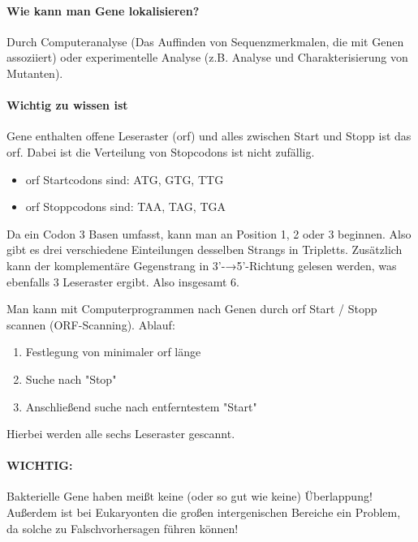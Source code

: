 \paragraph{Wie kann man Gene lokalisieren?} Durch Computeranalyse (Das Auffinden von Sequenzmerkmalen, die mit Genen assoziiert) oder experimentelle Analyse (z.B. Analyse und Charakterisierung von Mutanten).
\paragraph{Wichtig zu wissen ist} Gene enthalten offene Leseraster 
(\gls{orf}) und alles zwischen Start und Stopp ist das \gls{orf}. Dabei ist die Verteilung von Stopcodons ist nicht zufällig. 
\begin{itemize}
    \item \gls{orf} Startcodons sind: ATG, GTG, TTG 
\item \gls{orf} Stoppcodons sind: TAA, TAG, TGA 
\end{itemize}
\begin{mybox}[title=Wie gibt es für eine Sequenz verschiedene Leseraster? 
Wie viele Leseraster kann es geben?]
Da ein Codon 3 Basen umfasst, kann man an Position 1, 2 oder 3 beginnen. Also gibt es drei verschiedene Einteilungen desselben Strangs in Tripletts. Zusätzlich kann der komplementäre Gegenstrang in 3'-→5'-Richtung gelesen werden, was ebenfalls 3 Leseraster ergibt. Also insgesamt 6. 
\end{mybox}
Man kann mit Computerprogrammen nach Genen durch \gls{orf} Start / Stopp scannen (ORF-Scanning). 
Ablauf:
\begin{enumerate}
    \item Festlegung von minimaler \gls{orf} länge
    \item Suche nach "Stop"
    \item Anschließend suche nach entferntestem "Start"
\end{enumerate}
Hierbei werden alle sechs Leseraster gescannt.
\paragraph{WICHTIG:} Bakterielle Gene haben meißt keine (oder so gut wie keine) Überlappung!
Außerdem ist bei Eukaryonten die großen intergenischen Bereiche ein Problem, da solche zu Falschvorhersagen führen können!

